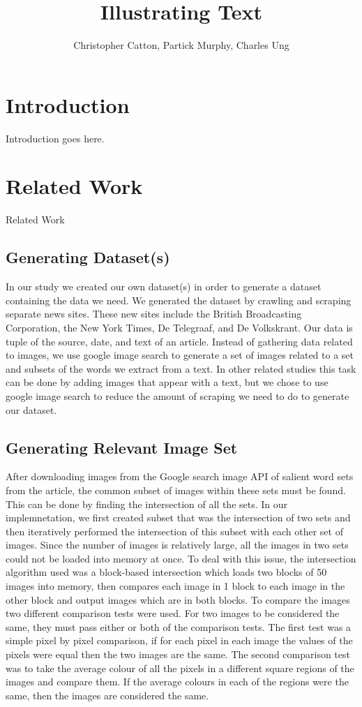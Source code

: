 \documentclass[12pt]{article}
\title{Illustrating Text}
\author{Christopher Catton, Partick Murphy, Charles Ung}
\begin{document}
\section{Introduction}
Introduction goes here.
\section{Related Work}
Related Work
\subsection{Generating Dataset(s)}
In our study we created our own dataset(s) in order to generate a dataset containing the data we need. We generated the dataset by crawling and scraping separate news sites. These new sites include the British Broadcasting Corporation, the New York Times, De Telegraaf, and De Volkskrant. Our data is tuple of the source, date, and text of an article.
Instead of gathering data related to images, we use google image search to generate a set of images related to a set and subsets of the words we extract from a text. In other related studies this task can be done by adding images that appear with a text, but we chose to use google image search to reduce the amount of scraping we need to do to generate our dataset.
\subsection{Generating Relevant Image Set}
After downloading images from the Google search image API of salient word sets from the article, the common subset of images within these sets must be found. This can be done by finding the intersection of all the sets. In our implemnetation, we first created subset that was the intersection of two sets and then iteratively performed the intersection of this subset with each other set of images.
Since the number of images is relatively large, all the images in two sets could not be loaded into memory at once. To deal with this issue, the intersection algorithm used was a block-based intersection which loads two blocks of 50 images into memory, then compares each image in 1 block to each image in the other block and output images which are in both blocks.
To compare the images two different comparison tests were used. For two images to be considered the same, they must pass either or both of the comparison tests. The first test was a simple pixel by pixel comparison, if for each pixel in each image the values of the pixels were equal then the two images are the same. The second comparison test was to take the average colour of all the pixels in a different square regions of the images and compare them. If the average colours in each of the regions were the same, then the images are considered the same.
\end{document}
